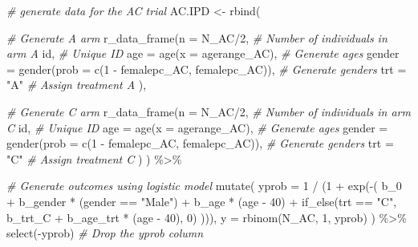 \documentclass[
]{article}
\newenvironment{Shaded}{\begin{snugshade}}{\end{snugshade}}
\newcommand{\AttributeTok}[1]{\textcolor[rgb]{0.77,0.63,0.00}{#1}}
\newcommand{\CommentTok}[1]{\textcolor[rgb]{0.56,0.35,0.01}{\textit{#1}}}
\newcommand{\DecValTok}[1]{\textcolor[rgb]{0.00,0.00,0.81}{#1}}
\newcommand{\FunctionTok}[1]{\textcolor[rgb]{0.00,0.00,0.00}{#1}}
\newcommand{\NormalTok}[1]{#1}
\newcommand{\OtherTok}[1]{\textcolor[rgb]{0.56,0.35,0.01}{#1}}
\newcommand{\SpecialCharTok}[1]{\textcolor[rgb]{0.00,0.00,0.00}{#1}}
\newcommand{\StringTok}[1]{\textcolor[rgb]{0.31,0.60,0.02}{#1}}
\begin{document}
\begin{Shaded}
\begin{Highlighting}[]
\CommentTok{\# generate data for the AC trial}
\NormalTok{AC.IPD }\OtherTok{\textless{}{-}}
  \FunctionTok{rbind}\NormalTok{(}
    
    \CommentTok{\# Generate A arm}
    \FunctionTok{r\_data\_frame}\NormalTok{(}\AttributeTok{n =}\NormalTok{ N\_AC}\SpecialCharTok{/}\DecValTok{2}\NormalTok{, }\CommentTok{\# Number of individuals in arm A}
\NormalTok{                 id, }\CommentTok{\# Unique ID}
                 \AttributeTok{age =} \FunctionTok{age}\NormalTok{(}\AttributeTok{x =}\NormalTok{ agerange\_AC), }\CommentTok{\# Generate ages}
                 \AttributeTok{gender =} \FunctionTok{gender}\NormalTok{(}\AttributeTok{prob =} \FunctionTok{c}\NormalTok{(}\DecValTok{1} \SpecialCharTok{{-}}\NormalTok{ femalepc\_AC, femalepc\_AC)), }\CommentTok{\# Generate genders}
                 \AttributeTok{trt =} \StringTok{"A"} \CommentTok{\# Assign treatment A}
\NormalTok{    ),}
    
    \CommentTok{\# Generate C arm}
    \FunctionTok{r\_data\_frame}\NormalTok{(}\AttributeTok{n =}\NormalTok{ N\_AC}\SpecialCharTok{/}\DecValTok{2}\NormalTok{, }\CommentTok{\# Number of individuals in arm C}
\NormalTok{                 id, }\CommentTok{\# Unique ID}
                 \AttributeTok{age =} \FunctionTok{age}\NormalTok{(}\AttributeTok{x =}\NormalTok{ agerange\_AC), }\CommentTok{\# Generate ages}
                 \AttributeTok{gender =} \FunctionTok{gender}\NormalTok{(}\AttributeTok{prob =} \FunctionTok{c}\NormalTok{(}\DecValTok{1} \SpecialCharTok{{-}}\NormalTok{ femalepc\_AC, femalepc\_AC)), }\CommentTok{\# Generate genders}
                 \AttributeTok{trt =} \StringTok{"C"} \CommentTok{\# Assign treatment C}
\NormalTok{    )}
\NormalTok{  ) }\SpecialCharTok{\%\textgreater{}\%}
  
  \CommentTok{\# Generate outcomes using logistic model}
  \FunctionTok{mutate}\NormalTok{(}
    \AttributeTok{yprob =} \DecValTok{1} \SpecialCharTok{/}\NormalTok{ (}\DecValTok{1} \SpecialCharTok{+} \FunctionTok{exp}\NormalTok{(}\SpecialCharTok{{-}}\NormalTok{(}
\NormalTok{      b\_0 }\SpecialCharTok{+}\NormalTok{ b\_gender }\SpecialCharTok{*}\NormalTok{ (gender }\SpecialCharTok{==} \StringTok{"Male"}\NormalTok{) }\SpecialCharTok{+}\NormalTok{ b\_age }\SpecialCharTok{*}\NormalTok{ (age }\SpecialCharTok{{-}} \DecValTok{40}\NormalTok{) }\SpecialCharTok{+}
        \FunctionTok{if\_else}\NormalTok{(trt }\SpecialCharTok{==} \StringTok{"C"}\NormalTok{, b\_trt\_C }\SpecialCharTok{+}\NormalTok{ b\_age\_trt }\SpecialCharTok{*}\NormalTok{ (age }\SpecialCharTok{{-}} \DecValTok{40}\NormalTok{), }\DecValTok{0}\NormalTok{)}
\NormalTok{    ))),}
    \AttributeTok{y =} \FunctionTok{rbinom}\NormalTok{(N\_AC, }\DecValTok{1}\NormalTok{, yprob)}
\NormalTok{  ) }\SpecialCharTok{\%\textgreater{}\%}
  \FunctionTok{select}\NormalTok{(}\SpecialCharTok{{-}}\NormalTok{yprob) }\CommentTok{\# Drop the yprob column}
\end{Highlighting}
\end{Shaded}
\end{document}
